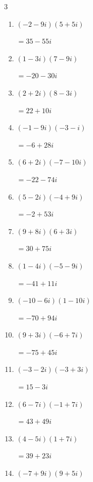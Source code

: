 \begin{multicols}{3}
\begin{enumerate}
  \item $\displaystyle (-2-9i)(5+5i)$

        $\displaystyle =35-55i$

  \item $\displaystyle (1-3i)(7-9i)$

        $\displaystyle =-20-30i$

  \item $\displaystyle (2+2i)(8-3i)$

        $\displaystyle =22+10i$

\columnbreak %

  \item $\displaystyle (-1-9i)(-3-i)$

        $\displaystyle =-6+28i$

  \item $\displaystyle (6+2i)(-7-10i)$

        $\displaystyle =-22-74i$

  \item $\displaystyle (5-2i)(-4+9i)$

        $\displaystyle =-2+53i$

  \item $\displaystyle (9+8i)(6+3i)$

        $\displaystyle =30+75i$

  \item $\displaystyle (1-4i)(-5-9i)$

        $\displaystyle =-41+11i$

  \item $\displaystyle (-10-6i)(1-10i)$

        $\displaystyle =-70+94i$

  \item $\displaystyle (9+3i)(-6+7i)$

        $\displaystyle =-75+45i$

  \item $\displaystyle (-3-2i)(-3+3i)$

        $\displaystyle =15-3i$

  \item $\displaystyle (6-7i)(-1+7i)$

        $\displaystyle =43+49i$

  \item $\displaystyle (4-5i)(1+7i)$

        $\displaystyle =39+23i$

  \item $\displaystyle (-7+9i)(9+5i)$


\end{enumerate}
\end{multicols}
